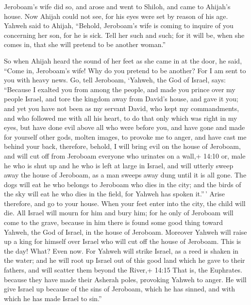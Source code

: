  Jeroboam's wife did so, and arose and went to Shiloh, and
came to Ahijah's house. Now Ahijah could not see, for his eyes were set
by reason of his age.  Yahweh said to Ahijah, ``Behold,
Jeroboam's wife is coming to inquire of you concerning her son, for he
is sick. Tell her such and such; for it will be, when she comes in, that
she will pretend to be another woman.''

 So when Ahijah heard the sound of her feet as she came in
at the door, he said, ``Come in, Jeroboam's wife! Why do you pretend to
be another? For I am sent to you with heavy news.  Go, tell
Jeroboam, `Yahweh, the God of Israel, says: ``Because I exalted you from
among the people, and made you prince over my people Israel,
 and tore the kingdom away from David's house, and gave it
you; and yet you have not been as my servant David, who kept my
commandments, and who followed me with all his heart, to do that only
which was right in my eyes,  but have done evil above all
who were before you, and have gone and made for yourself other gods,
molten images, to provoke me to anger, and have cast me behind your
back,  therefore, behold, I will bring evil on the house of
Jeroboam, and will cut off from Jeroboam everyone who urinates on a
wall,+ 14:10 or, male he who is shut up and he who is left at large in
Israel, and will utterly sweep away the house of Jeroboam, as a man
sweeps away dung until it is all gone.  The dogs will eat
he who belongs to Jeroboam who dies in the city; and the birds of the
sky will eat he who dies in the field, for Yahweh has spoken it.''\,'
 Arise therefore, and go to your house. When your feet
enter into the city, the child will die.  All Israel will
mourn for him and bury him; for he only of Jeroboam will come to the
grave, because in him there is found some good thing toward Yahweh, the
God of Israel, in the house of Jeroboam.  Moreover Yahweh
will raise up a king for himself over Israel who will cut off the house
of Jeroboam. This is the day! What? Even now.  For Yahweh
will strike Israel, as a reed is shaken in the water; and he will root
up Israel out of this good land which he gave to their fathers, and will
scatter them beyond the River,+ 14:15 That is, the Euphrates. because
they have made their Asherah poles, provoking Yahweh to anger.
 He will give Israel up because of the sins of Jeroboam,
which he has sinned, and with which he has made Israel to sin.''


